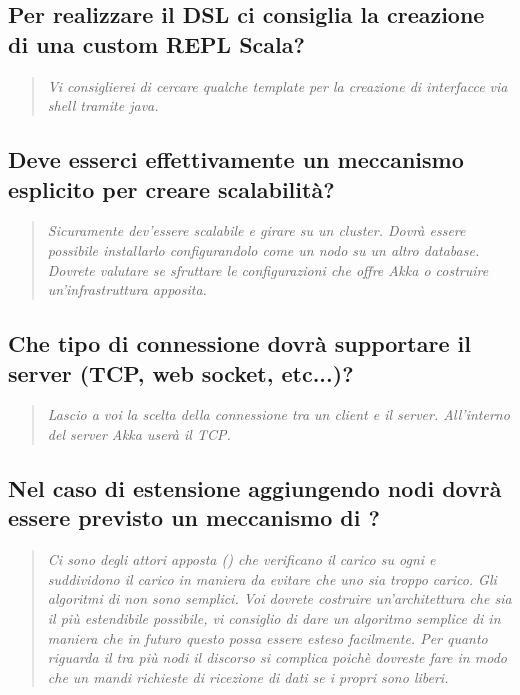 \documentclass{scalatekids-article}
\begin{document}
\subsection{Per realizzare il DSL ci consiglia la creazione di una custom REPL Scala?}
\begin{quote}
  \textit{Vi consiglierei di cercare qualche template per la creazione di interfacce via shell tramite java.\\}
\end{quote}
\subsection{Deve esserci effettivamente un meccanismo esplicito per creare scalabilità?}
\begin{quote}
  \textit{Sicuramente dev'essere scalabile e girare su un cluster. Dovrà essere possibile installarlo configurandolo come un nodo su un altro database. Dovrete valutare se sfruttare le configurazioni che 
  offre Akka o costruire un'infrastruttura apposita.\\}
\end{quote}
\subsection{Che tipo di connessione dovrà supportare il server (TCP, web socket, etc...)?}
\begin{quote}
  \textit{Lascio a voi la scelta della connessione tra un client e il server. All'interno del server Akka userà il TCP.\\}
\end{quote}
\subsection{Nel caso di estensione aggiungendo nodi dovrà essere previsto un meccanismo di ?}
\begin{quote}
  \textit{Ci sono degli attori apposta () che verificano il carico su ogni  e suddividono il carico in maniera da evitare che uno  sia troppo carico. 
  Gli algoritmi di  non sono semplici. Voi dovrete costruire un'architettura che sia il più estendibile possibile, vi consiglio di dare un algoritmo semplice di  in maniera che in futuro questo possa essere esteso facilmente. Per quanto riguarda il  tra più nodi il discorso si complica poichè dovreste fare in modo che un  mandi richieste di ricezione di dati se i propri  sono liberi.\\}
\end{quote}
\end{document}
